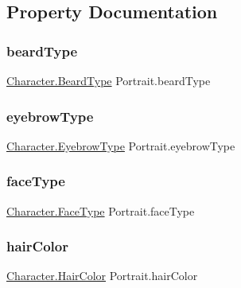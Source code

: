 \subsection{Property Documentation}
\mbox{\label{class_portrait_acc7fbe447bbd427f26e0490b868febd3}} 
\subsubsection{\texorpdfstring{beardType}{beardType}}
{\footnotesize\ttfamily \mbox{\hyperlink{class_character_afc1fe7f790870a92fe62d3e57296de81}{Character.\+Beard\+Type}} Portrait.\+beard\+Type\hspace{0.3cm}{\ttfamily [get]}}

\mbox{\label{class_portrait_a1a002dfca19c85ae7724a0e3210ca97a}} 
\subsubsection{\texorpdfstring{eyebrowType}{eyebrowType}}
{\footnotesize\ttfamily \mbox{\hyperlink{class_character_a7ba51a2ab6ee02a615df9275665c5e4c}{Character.\+Eyebrow\+Type}} Portrait.\+eyebrow\+Type\hspace{0.3cm}{\ttfamily [get]}}

\mbox{\label{class_portrait_adee621ae3df1fbf3ed96e9262d9e3699}} 
\subsubsection{\texorpdfstring{faceType}{faceType}}
{\footnotesize\ttfamily \mbox{\hyperlink{class_character_aae9a74ea017a528536789f545094d628}{Character.\+Face\+Type}} Portrait.\+face\+Type\hspace{0.3cm}{\ttfamily [get]}}

\mbox{\label{class_portrait_a656bde64b3ef49fa317d114d1c3fbe7c}} 
\subsubsection{\texorpdfstring{hairColor}{hairColor}}
{\footnotesize\ttfamily \mbox{\hyperlink{class_character_a7940fffce9bfadb9e7abf15490cf8bb0}{Character.\+Hair\+Color}} Portrait.\+hair\+Color\hspace{0.3cm}{\ttfamily [get]}}

